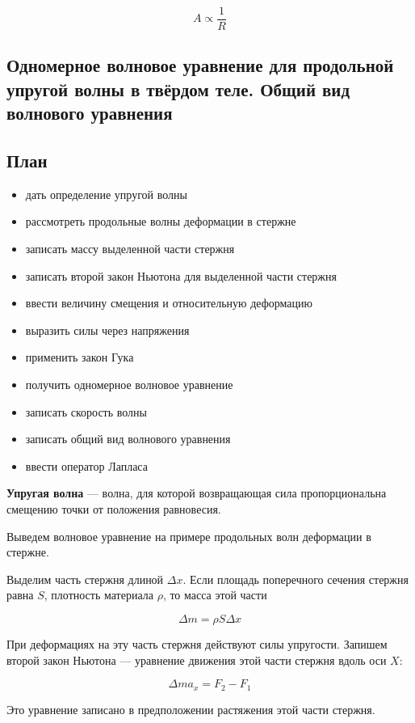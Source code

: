 \documentclass[a4paper,12pt]{article}
\begin{document}
\[
A \propto \frac{1}{R}
\]

\subsection{Одномерное волновое уравнение для продольной упругой волны в твёрдом теле. Общий вид волнового уравнения}

\subsection*{План}
\begin{itemize}
\item дать определение упругой волны
\item рассмотреть продольные волны деформации в стержне
\item записать массу выделенной части стержня
\item записать второй закон Ньютона для выделенной части стержня
\item ввести величину смещения и относительную деформацию
\item выразить силы через напряжения
\item применить закон Гука
\item получить одномерное волновое уравнение
\item записать скорость волны
\item записать общий вид волнового уравнения
\item ввести оператор Лапласа
\end{itemize}

\begin{definitionbox}
\textbf{Упругая волна} — волна, для которой возвращающая сила пропорциональна смещению точки от положения равновесия.
\end{definitionbox}

Выведем волновое уравнение на примере продольных волн деформации в стержне.

Выделим часть стержня длиной \(\Delta x\). Если площадь поперечного сечения стержня равна \(S\), плотность материала \(\rho\), то масса этой части

\[
\Delta m = \rho S \Delta x
\]

При деформациях на эту часть стержня действуют силы упругости. Запишем второй закон Ньютона — уравнение движения этой части стержня вдоль оси \(X\):

\[
\Delta m a_x = F_2 - F_1
\]

Это уравнение записано в предположении растяжения этой части стержня.
\end{document}
